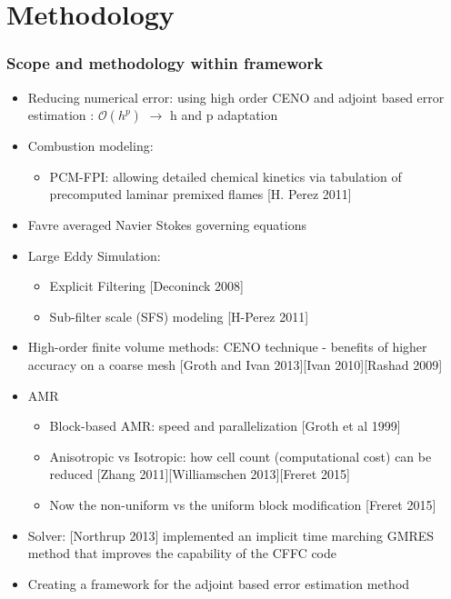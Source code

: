 \documentclass{beamer}
\begin{document}

\section[Methodology]{Methodology}
\begin{frame}%
\frametitle{Scope and methodology within framework}
\scriptsize

\begin{itemize}
\item Reducing numerical error: using high order CENO and adjoint based error estimation : {$\mathcal{O}(h^p)$} $\rightarrow$ h and p adaptation

\item Combustion modeling:
  \begin{itemize}
   \tiny
   \item PCM-FPI: allowing detailed chemical kinetics via tabulation of precomputed laminar premixed flames [H. Perez 2011]
   \end{itemize}  


\item Favre averaged Navier Stokes governing equations

\item Large Eddy Simulation:
  \begin{itemize}
  \tiny
   \item Explicit Filtering [Deconinck 2008]
   \item Sub-filter scale (SFS) modeling [H-Perez 2011]
  \end{itemize}

\item High-order finite volume methods: CENO technique - benefits of higher accuracy on a coarse mesh [Groth and Ivan 2013][Ivan 2010][Rashad 2009]


\item AMR
   \begin{itemize}
   \tiny
   \item Block-based AMR: speed and parallelization [Groth et al 1999]
   \item Anisotropic vs Isotropic: how cell count (computational cost) can be reduced [Zhang 2011][Williamschen 2013][Freret 2015]
   \item Now the non-uniform vs the uniform block modification [Freret 2015]
   \end{itemize}
   
\item Solver: [Northrup 2013] implemented an implicit time marching GMRES method that improves the capability of the CFFC code   
   
\item Creating a framework for the adjoint based error estimation method
\end{itemize}
\end{frame}
\end{document}

